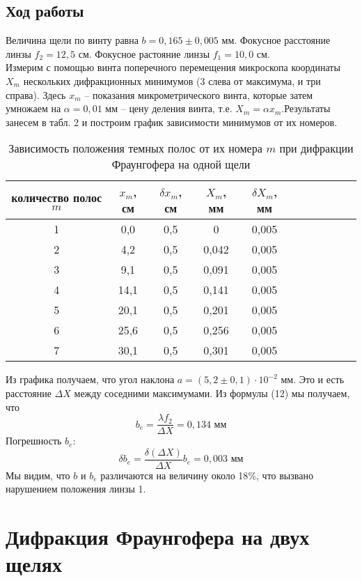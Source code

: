 \documentclass[12pt]{article}
\begin{document}
	\subsection{Ход работы}
	Величина щели по винту равна $b = 0,165 \pm 0,005$ мм. Фокусное расстояние линзы $f_2 = 12,5$ см. Фокусное растояние линзы $f_1 = 10,0$ см.\\
	Измерим с помощью винта поперечного перемещения микроскопа координаты $X_m$ нескольких дифракционных минимумов (3 слева от максимума, и три справа). Здесь $x_m$ -- показания микрометрического винта, которые затем умножаем на $\alpha = 0,01$ мм -- цену деления винта, т.е. $X_m = \alpha x_m$.\newpage Результаты занесем в табл. 2 и построим график зависимости минимумов от их номеров.

	\begin{table}[h!]
		\begin{tabular}{||c|c|c|c|c||c||c||l|l||l|l|}
			\hline
			
			\hline
			количество полос $m$ & $x_m$, см&  $\delta x_m$, см  &  $X_m$, мм & $\delta X_m$, мм \\
			\hline
			1 & 0,0 & 0,5 & 0 & 0,005 \\
			2 & 4,2 & 0,5 & 0,042 & 0,005 \\
			3 & 9,1 & 0,5 & 0,091 & 0,005 \\
			4 & 14,1 & 0,5 & 0,141 & 0,005 \\
			5 & 20,1 & 0,5 & 0,201 & 0,005 \\
			6 & 25,6 & 0,5 & 0,256 & 0,005\\
			7 & 30,1 & 0,5 & 0,301 & 0,005\\
			\hline
		\end{tabular}
		\caption{Зависимость положения темных полос от их номера $m$ при дифракции Фраунгофера на одной щели}
	\end{table}
	Из графика получаем, что угол наклона $a = (5,2 \pm 0,1) \cdot 10^{-2}$ мм. Это и есть расстояние $\Delta X$ между соседними максимумами. Из формулы (12) мы получаем, что \begin{equation}
	b_e = \frac{\lambda f_2}{\Delta X} = 0,134 \mbox{ мм}
	\end{equation}
	Погрешность $b_e$:
	\begin{equation}
	\delta b_e = \frac{\delta (\Delta X)}{\Delta X} b_e = 0,003 \mbox{ мм}
	\end{equation}
	Мы видим, что $b$ и $b_e$ различаются на величину около 18$\%$, что вызвано нарушением положения линзы 1. 
	\section{Дифракция Фраунгофера на двух щелях}
\end{document}
